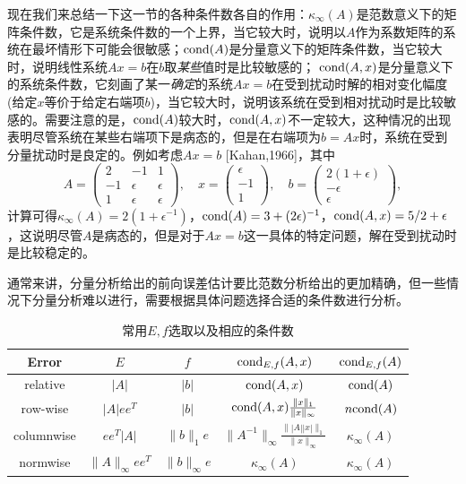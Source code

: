 \documentclass[a4paper,10pt]{ctexart}
\begin{document}
现在我们来总结一下这一节的各种条件数各自的作用：$ \kappa_\infty(A) $是范数意义下的矩阵条件数，它是系统条件数的一个上界，当它较大时，说明以$ A $作为系数矩阵的系统在最坏情形下可能会很敏感；$ {\rm cond}(A) $是分量意义下的矩阵条件数，当它较大时，说明线性系统$ Ax=b $在$ b $取\emph{某些}值时是比较敏感的； $ {\rm cond}(A,x) $是分量意义下的系统条件数，它刻画了某一\emph{确定}的系统$ Ax=b $在受到扰动时解的相对变化幅度(给定$ x $等价于给定右端项$ b $)，当它较大时，说明该系统在受到相对扰动时是比较敏感的。需要注意的是，$ {\rm cond}(A) $较大时，$ {\rm cond}(A,x) $不一定较大，这种情况的出现表明尽管系统在某些右端项下是病态的，但是在右端项为$ b=Ax $时，系统在受到分量扰动时是良定的。例如考虑$ Ax=b $ [Kahan,1966]，其中
\[
    A = 
    \begin{pmatrix}
        2 & -1 & 1\\
        -1 & \epsilon & \epsilon\\
        1 & \epsilon & \epsilon
    \end{pmatrix},\quad 
    x = 
    \begin{pmatrix}
        \epsilon\\
        -1\\
        1
    \end{pmatrix},\quad
    b = 
    \begin{pmatrix}
        2(1+\epsilon)\\
        -\epsilon\\
        \epsilon
    \end{pmatrix},
\]
计算可得$ \kappa_\infty(A) = 2(1+\epsilon^{-1}) $，$ {\rm cond}(A) = 3+(2\epsilon)^{-1} $，$ {\rm cond}(A,x) = 5 / 2+\epsilon $，这说明尽管$ A $是病态的，但是对于$ Ax=b $这一具体的特定问题，解在受到扰动时是比较稳定的。

通常来讲，分量分析给出的前向误差估计要比范数分析给出的更加精确，但一些情况下分量分析难以进行，需要根据具体问题选择合适的条件数进行分析。

\begin{table}[h]
    \centering
    \begin{tabular}{ccccc}
        \toprule
        Error & $ E $ & $ f $ & $ {\rm cond}_{E,f}(A,x) $ & $ {\rm cond}_{E,f}(A) $ \\
        \midrule
        relative & $ |A| $ & $ |b| $ & $ {\rm cond}(A,x) $ & $ {\rm cond}(A) $ \\
        row-wise & $ |A|ee^T $ & $ |b| $ & $ {\rm cond}(A,x) \frac{\| x \|_1}{\| x \|_\infty} $ & $ n {\rm cond}(A) $ \\
        columnwise & $ ee^T|A| $ & $ \| b \|_1 e $ & $ \| A^{-1} \|_\infty \frac{\| |A||x| \|_1}{\| x \|_\infty} $ & $ \kappa_\infty(A) $ \\
        normwise & $ \| A \|_\infty ee^T $ & $ \| b \|_\infty e $ & $ \kappa_\infty(A) $ & $ \kappa_\infty(A) $ \\
        \bottomrule
    \end{tabular}
    \caption{常用$ E,f $选取以及相应的条件数}
    \label{tab:cond}
\end{table}
\end{document}
